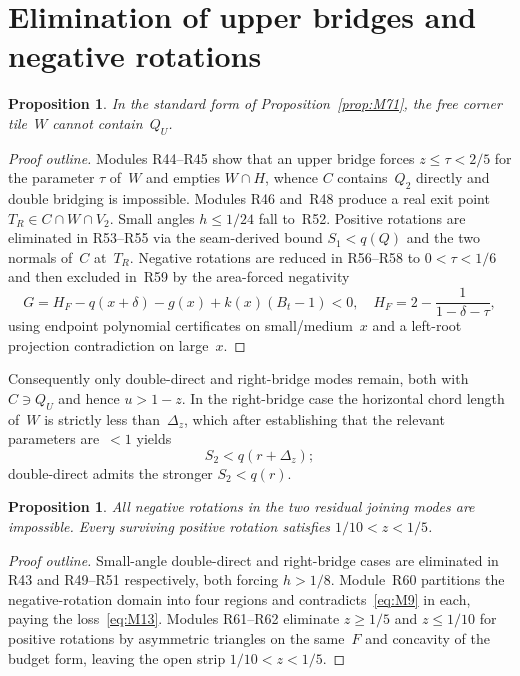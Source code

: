 \documentclass[11pt,reqno]{amsart}
\newtheorem{proposition}[theorem]{Proposition}
\theoremstyle{definition}
\begin{document}
\section{Elimination of upper bridges and negative rotations}\label{sec:M9}

\begin{proposition}\label{prop:M91}
In the standard form of Proposition~\ref{prop:M71}, the free corner tile~$W$
cannot contain~$Q_U$.
\end{proposition}

\begin{proof}[Proof outline]
Modules R44--R45 show that an upper bridge forces $z\le\tau<2/5$ for the
parameter $\tau$ of~$W$ and empties $W\cap H$, whence $C$ contains~$Q_2$
directly and double bridging is impossible.  Modules R46 and~R48 produce a
real exit point $T_R\in C\cap W\cap V_2$.  Small angles $h\le 1/24$ fall to~R52.
Positive rotations are eliminated in R53--R55 via the seam-derived bound
$S_1<q(Q)$ and the two normals of~$C$ at~$T_R$.  Negative rotations are reduced
in R56--R58 to $0<\tau<1/6$ and then excluded in~R59 by the area-forced
negativity
\begin{equation}\label{eq:M12}
G=H_F-q(x+\delta)-g(x)+k(x)(B_t-1)<0,
\quad H_F=2-\frac1{1-\delta-\tau},
\end{equation}
using endpoint polynomial certificates on small/medium~$x$ and a left-root
projection contradiction on large~$x$.
\end{proof}

Consequently only double-direct and right-bridge modes remain, both with
$C\ni Q_U$ and hence $u>1-z$.  In the right-bridge case the horizontal chord
length of~$W$ is strictly less than~$\Delta_z$, which after establishing that
the relevant parameters are~$<1$ yields
\begin{equation}\label{eq:M13}
S_2<q(r+\Delta_z);
\end{equation}
double-direct admits the stronger $S_2<q(r)$.

\begin{proposition}\label{prop:M92}
All negative rotations in the two residual joining modes are impossible.
Every surviving positive rotation satisfies $1/10<z<1/5$.
\end{proposition}

\begin{proof}[Proof outline]
Small-angle double-direct and right-bridge cases are eliminated in R43 and
R49--R51 respectively, both forcing $h>1/8$.  Module~R60 partitions the
negative-rotation domain into four regions and contradicts~\eqref{eq:M9} in
each, paying the loss~\eqref{eq:M13}.  Modules R61--R62 eliminate
$z\ge 1/5$ and $z\le 1/10$ for positive rotations by asymmetric triangles on
the same~$F$ and concavity of the budget form, leaving the open strip
$1/10<z<1/5$.
\end{proof}
\end{document}
